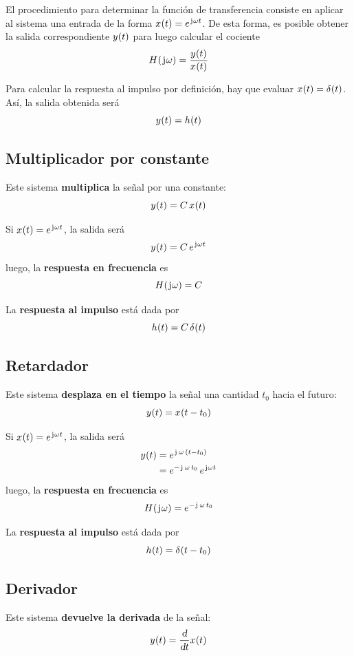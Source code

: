 El procedimiento para determinar la función de transferencia consiste en aplicar al sistema una entrada de la forma \( \fx[x]{t} = e^{\iu \omega t} \).
De esta forma, es posible obtener la salida correspondiente \( \fx[y]{t} \) para luego calcular el cociente
\[
    \fx[H]{\iu \omega} = \frac{\fx[y]{t}}{\fx[x]{t}}
\]

Para calcular la respuesta al impulso por definición, hay que evaluar $\fx[x]{t} = \fx[\delta]{t}$.
Así, la salida obtenida será
\[
    \fx[y]{t} = \fx[h]{t}
\]

\subsection{Multiplicador por constante}

Este sistema \textbf{multiplica} la señal por una constante:
\[
    \fx[y]{t} = C \, \fx[x]{t}
\]

Si $\fx[x]{t} = e^{\iu \omega t}$, la salida será
\[
    \fx[y]{t} = C \, e^{\iu \omega t}
\]
luego, la \textbf{respuesta en frecuencia} es
\[
    \fx[H]{\iu \omega} = C
\]

La \textbf{respuesta al impulso} está dada por
\[
    \fx[h]{t} = C \, \fx[\delta]{t}
\]

\subsection{Retardador}

Este sistema \textbf{desplaza en el tiempo} la señal una cantidad $t_0$ hacia el futuro:
\[
    \fx[y]{t} = \fx[x]{t - t_0}
\]

Si $\fx[x]{t} = e^{\iu \omega t}$, la salida será
\begin{align*}
    \fx[y]{t}
    & = e^{\iu \, \omega \, (t - t_0)}
    \\
    & = e^{-\iu \, \omega \, t_0} \, e^{\iu \omega t}
\end{align*}
luego, la \textbf{respuesta en frecuencia} es
\[
    \fx[H]{\iu \omega} = e^{- \iu \, \omega \, t_0}
\]

La \textbf{respuesta al impulso} está dada por
\[
    \fx[h]{t} = \fx[\delta]{t - t_0}
\]

\subsection{Derivador}

Este sistema \textbf{devuelve la derivada} de la señal:
\[
    \fx[y]{t} = \frac{\dif}{\dif t} \fx[x]{t}
\]

